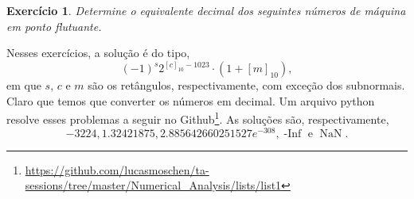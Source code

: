 \documentclass[a4paper,12pt]{article}
\theoremstyle{exer}
\newtheorem{exercise}{Exercício}
\theoremstyle{definition}
\begin{document}
\begin{enumerate}
\end{enumerate}

\begin{exercise}
    Determine o equivalente decimal dos seguintes números de máquina em ponto
    flutuante.
\end{exercise}

Nesses exercícios, a solução é do tipo, 
$$
(-1)^s 2^{[c]_{10} - 1023} \cdot (1 + [m]_{10}), 
$$
em que $s$, $c$ e $m$ são os retângulos, respectivamente, com exceção dos subnormais. Claro que temos que
converter os números em decimal. Um arquivo python resolve esses problemas a
seguir no
Github\footnote{\url{https://github.com/lucasmoschen/ta-sessions/tree/master/Numerical_Analysis/lists/list1}}.
As soluções são, respectivamente, 
$$-3224, 1.32421875, 2.885642660251527e^{-308}, \operatorname{-Inf} \text{ e } \operatorname{NaN}.$$
\end{document}
